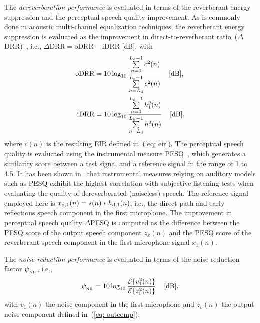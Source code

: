\documentclass[10pt]{IEEEtran}
\begin{document}
The \emph{dereverberation performance} is evaluated in terms of the reverberant energy suppression and the perceptual speech quality improvement. 
As is commonly done in acoustic multi-channel equalization techniques, the reverberant energy suppression is evaluated as the improvement in direct-to-reverberant ratio~($\Delta$DRR)~\cite{Naylor_Derev_book}, i.e., $\Delta {\text{DRR}} = {\text{oDRR}} - {\text{iDRR}}$ [dB], with
\begin{align}
{\text{oDRR}} &= 10 \log_{10} \frac{\sum\limits_{n=0}^{L_{\rm{d}}-1} c^2(n)}{\sum\limits_{n=L_{\rm{d}}}^{L_c-1} c^2(n)} \; \; \; \; [\rm{dB}], \\
{\text{iDRR}} &= 10 \log_{10} \frac{\sum\limits_{n=0}^{L_{\rm{d}}-1} h_1^2(n)}{\sum\limits_{n=L_{\rm{d}}}^{L_h-1} h_1^2(n)} \; \; \; \; [\rm{dB}],
\end{align}
where $c(n)$ is the resulting EIR defined in~(\ref{eq: eir}).
The perceptual speech quality is evaluated using the instrumental measure PESQ~\cite{PESQ}, which generates a similarity score between a test signal and a reference signal in the range of 1 to 4.5. 
{{It has been shown in~\cite{Goetze_AES_2010} that instrumental measures relying on auditory models such as PESQ exhibit the highest correlation with subjective listening tests when evaluating the quality of dereverberated (noiseless) speech.}}
The reference signal employed here is $x_{{\rm{d}},1}(n) = s(n) \ast h_{{\rm{d}},1}(n)$, i.e., the direct path and early reflections speech component in the first microphone. 
The improvement in perceptual speech quality $\Delta$PESQ is computed as the difference between the PESQ score of the output speech component $z_x(n)$ and the PESQ score of the reverberant speech component in the first microphone signal $x_1(n)$.

The \emph{noise reduction performance} is evaluated in terms of the noise reduction factor $\psi_{_{\rm NR}}$, i.e., 
\begin{equation}
\psi_{_{\rm NR}} = 10 \log_{10} \frac{{\cal{E}} \{v_1^2(n)\}}{{\cal{E}} \{z_v^2(n)\}} \; \; \; \; [\rm{dB}],
\end{equation}
with $v_1(n)$ the noise component in the first microphone and $z_v(n)$ the output noise component defined in~(\ref{eq: outcomp}).
\end{document}
